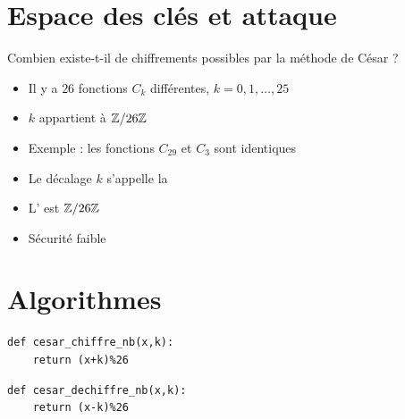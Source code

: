 \section{Espace des clés et attaque}

\begin{frame}
Combien existe-t-il de chiffrements possibles par la méthode de César ?

\pause

\begin{itemize}[<+->]
  \item Il y a $26$ fonctions $C_k$ différentes, $k=0,1,\ldots,25$
  \item $k$ appartient à $\mathbb{Z} / 26 \mathbb{Z}$
  \item Exemple : les fonctions $C_{29}$ et $C_3$ sont identiques
  \item Le décalage $k$ s'appelle la 
  \item L' est
$\mathbb{Z}/26\mathbb{Z}$
  \item Sécurité faible
\end{itemize}

\end{frame}


\section{Algorithmes}

\begin{frame}[fragile]

\begin{algo}[cesar.py (1)]
\begin{lstlisting}
def cesar_chiffre_nb(x,k):   
    return (x+k)%26
\end{lstlisting}  
\end{algo}

\pause
\bigskip

\begin{algo}[cesar.py (2)]
\begin{lstlisting}
def cesar_dechiffre_nb(x,k):   
    return (x-k)%26
\end{lstlisting}  
\end{algo}

\end{frame}

